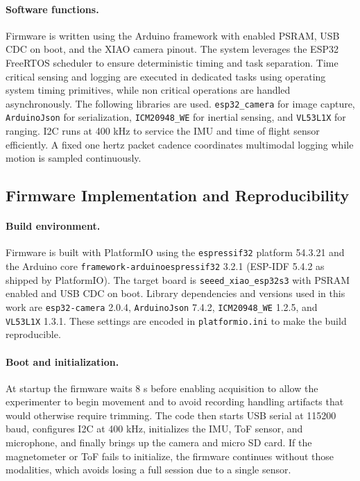 \documentclass[manuscript,review,anonymous]{acmart}
\begin{document}
\paragraph{Software functions.}
Firmware is written using the Arduino framework with enabled PSRAM, USB CDC on boot, and the XIAO camera pinout. The system leverages the ESP32 FreeRTOS scheduler to ensure deterministic timing and task separation. Time critical sensing and logging are executed in dedicated tasks using operating system timing primitives, while non critical operations are handled asynchronously. The following libraries are used. \texttt{esp32\_camera} for image capture, \texttt{ArduinoJson} for serialization, \texttt{ICM20948\_WE} for inertial sensing, and \texttt{VL53L1X} for ranging. I2C runs at 400 kHz to service the IMU and time of flight sensor efficiently. A fixed one hertz packet cadence coordinates multimodal logging while motion is sampled continuously.

\subsection{Firmware Implementation and Reproducibility}
\paragraph{Build environment.}
Firmware is built with PlatformIO using the \texttt{espressif32} platform 54.3.21 and the Arduino core \texttt{framework-arduinoespressif32} 3.2.1 (ESP-IDF 5.4.2 as shipped by PlatformIO). The target board is \texttt{seeed\_xiao\_esp32s3} with PSRAM enabled and USB CDC on boot. Library dependencies and versions used in this work are \texttt{esp32-camera} 2.0.4, \texttt{ArduinoJson} 7.4.2, \texttt{ICM20948\_WE} 1.2.5, and \texttt{VL53L1X} 1.3.1. These settings are encoded in \texttt{platformio.ini} to make the build reproducible.

\paragraph{Boot and initialization.}
At startup the firmware waits 8 s before enabling acquisition to allow the experimenter to begin movement and to avoid recording handling artifacts that would otherwise require trimming. The code then starts USB serial at 115200 baud, configures I2C at 400 kHz, initializes the IMU, ToF sensor, and microphone, and finally brings up the camera and micro SD card. If the magnetometer or ToF fails to initialize, the firmware continues without those modalities, which avoids losing a full session due to a single sensor.
\end{document}
